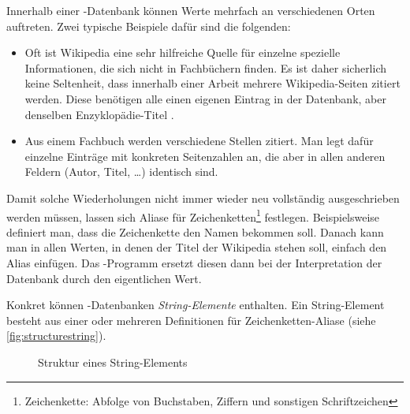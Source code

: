 Innerhalb einer \mbox{\BibTeX-}Datenbank können Werte mehrfach an verschiedenen
Orten auftreten. Zwei typische Beispiele dafür sind die folgenden:
\begin{itemize}
    \item Oft ist Wikipedia eine sehr hilfreiche Quelle für einzelne spezielle
        Informationen, die sich nicht in Fachbüchern finden. Es ist daher
        sicherlich keine Seltenheit, dass innerhalb einer Arbeit mehrere
        Wikipedia-Seiten zitiert werden. Diese benötigen alle einen eigenen
        Eintrag in der Datenbank, aber denselben Enzyklopädie-Titel \temp.
    \item Aus einem Fachbuch werden verschiedene Stellen zitiert. Man legt dafür
        einzelne Einträge mit konkreten Seitenzahlen an, die aber in allen
        anderen Feldern (Autor, Titel, \dots) identisch sind.
\end{itemize}
Damit solche Wiederholungen nicht immer wieder neu vollständig ausgeschrieben
werden müssen, lassen sich Aliase für Zeichenketten\footnote{
    {\titlelike Zeichenkette:} Abfolge von Buchstaben, Ziffern und sonstigen Schriftzeichen
} festlegen. Beispielsweise definiert man, dass die Zeichenkette \temp{} den
Namen  bekommen soll. Danach kann man in allen Werten, in denen der Titel der Wikipedia stehen soll, einfach den Alias 
einfügen. Das \mbox{\BibTeX-}Programm ersetzt diesen dann bei der Interpretation
der Datenbank durch den eigentlichen Wert.

Konkret können \mbox{\BibTeX-}Datenbanken \emph{String-Elemente} enthalten. Ein
String-Element besteht aus einer oder mehreren Definitionen für Zeichenketten-Aliase (siehe \autoref{fig:structurestring}).

\begin{figure}
    \centering
    \caption{Struktur eines String-Elements}
    \label{fig:structurestring}
\end{figure}
